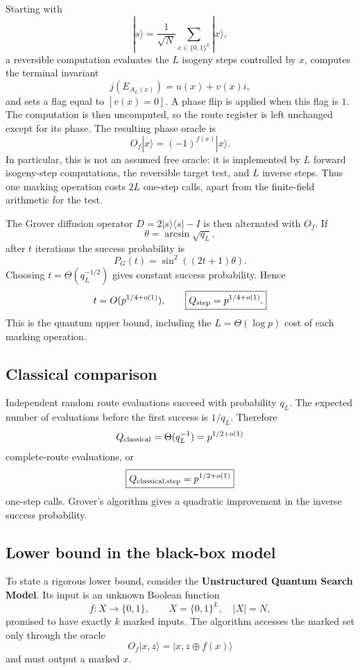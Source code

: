 \documentclass[10pt,a4paper]{article}
\begin{document}
Starting with
\[
|s\rangle=\frac1{\sqrt N}\sum_{x\in\{0,1\}^L}|x\rangle,
\]
a reversible computation evaluates the \(L\) isogeny steps
controlled by \(x\), computes the terminal invariant
\[
j(E_{A_L(x)})=u(x)+v(x)i,
\]
and sets a flag equal to \([v(x)=0]\). A phase flip is applied
when this flag is \(1\). The computation is then uncomputed,
so the route register is left unchanged except for its phase.
The resulting phase oracle is
\[
\boxed{O_f|x\rangle=(-1)^{f(x)}|x\rangle.}
\]
In particular, this is not an assumed free oracle: it is
implemented by \(L\) forward isogeny-step computations,
the reversible target test, and \(L\) inverse steps.
Thus one marking operation costs \(2L\) one-step calls,
apart from the finite-field arithmetic for the test.

The Grover diffusion operator \(D=2|s\rangle\langle s|-I\)
is then alternated with \(O_f\). If
\[
\theta=\arcsin\sqrt{q_L},
\]
after \(t\) iterations the success probability is
\[
P_G(t)=\sin^2((2t+1)\theta).
\]
Choosing \(t=\Theta(q_L^{-1/2})\) gives constant success
probability. Hence
\[
t=O(p^{1/4+o(1)}),
\qquad
\boxed{Q_{\rm step}=p^{1/4+o(1)}.}
\]
This is the quantum upper bound, including the
\(L=\Theta(\log p)\) cost of each marking operation.

\subsection*{Classical comparison}

Independent random route evaluations succeed with probability
\(q_L\). The expected number of evaluations before the first
success is \(1/q_L\). Therefore
\[
Q_{\rm classical}
=\Theta(q_L^{-1})
=p^{1/2+o(1)}
\]
complete-route evaluations, or
\[
\boxed{Q_{\rm classical,step}=p^{1/2+o(1)}}
\]
one-step calls. Grover's algorithm gives a quadratic
improvement in the inverse success probability.

\subsection*{Lower bound in the black-box model}

To state a rigorous lower bound, consider the
\textbf{Unstructured Quantum Search Model}. Its input is an
unknown Boolean function
\[
f:X\longrightarrow\{0,1\},\qquad
X=\{0,1\}^L,\quad |X|=N,
\]
promised to have exactly \(k\) marked inputs. The algorithm
accesses the marked set only through the oracle
\[
O_f|x,z\rangle=|x,z\oplus f(x)\rangle
\]
and must output a marked \(x\).
\end{document}
